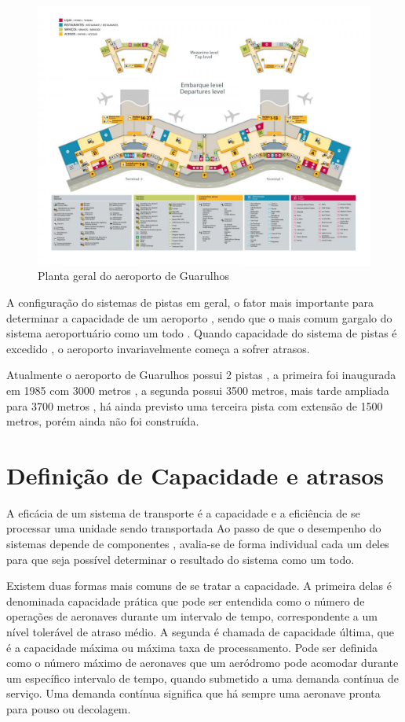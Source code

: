 \documentclass[12pt]{article}
\begin{document}
\begin{figure}[b!]
  \centering
  \includegraphics[width=.9\textwidth]{aeroporto.png}
  \caption{Planta geral do aeroporto de Guarulhos}
  \label{fig:aeropoto}
\end{figure}

A configuração do sistemas de pistas em geral, o fator mais importante
para determinar a capacidade de um aeroporto , sendo que o mais comum 
gargalo do sistema aeroportuário como um todo . Quando capacidade do 
sistema de pistas é excedido , o aeroporto invariavelmente começa a 
sofrer atrasos.



Atualmente o aeroporto de Guarulhos possui 2 pistas , a primeira foi 
inaugurada em 1985 com  3000 metros , a segunda possui 3500 metros, 
mais tarde ampliada para 3700 metros , há ainda previsto uma terceira
pista com extensão de 1500 metros, porém ainda não foi construída. 


\section{Definição de Capacidade e atrasos}

A eficácia de um sistema de transporte é a capacidade e a eficiência de
se processar uma unidade sendo transportada Ao passo de que o desempenho
do sistemas depende de componentes , avalia-se de forma individual cada
um deles para que seja possível determinar o resultado do sistema como 
um todo. 

Existem duas formas mais comuns de se tratar a capacidade. A primeira delas
é denominada capacidade prática que pode ser entendida como o número de 
operações de aeronaves durante um intervalo de tempo, correspondente a um
nível tolerável de atraso médio. A segunda é chamada de capacidade última,
que é a capacidade máxima ou máxima taxa de processamento. Pode ser 
definida como o número máximo de aeronaves que um aeródromo pode acomodar
durante um específico intervalo de tempo, quando submetido a uma demanda
contínua de serviço. Uma demanda contínua significa que há sempre uma 
aeronave pronta para pouso ou decolagem. 
\end{document}
